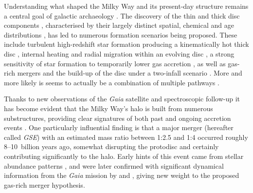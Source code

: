 \documentclass[fleqn,usenatbib]{mnras}
\begin{document}
Understanding what shaped the Milky Way and its present-day structure remains a central goal of galactic archaeology \citep{FreemanBlandHawthorn2002,BlandHawthorn_Gerhard2016}. The discovery of the thin and thick disc components \citep{Yoshii1982, Gilmore1983}, characterised by their largely distinct spatial, chemical and age distributions \citep[for example][]{Bensby2014, Hayden2015}, has led to numerous formation scenarios being proposed. These include turbulent high-redshift star formation producing a kinematically hot thick disc \citep{Bird2013, Stinson2013}, internal heating and radial migration within an evolving disc \citep{Schoenrich2009, Minchev2013, Sharma2021b}, a strong sensitivity of star formation to temporarily lower gas accretion \citep{Grand2018, Orkney2025}, as well as gas-rich mergers \citep{Brook2004, Buck2020} and the build-up of the disc under a two-infall scenario \citep{Chiappini1997, Spitoni2019}. More and more likely is seems to actually be a combination of multiple pathways \citep[e.g.][]{Orkney2025}.

Thanks to new observations of the \textit{Gaia} satellite \citep{Brown2021b} and spectroscopic follow-up it has become evident that the Milky Way's halo is built from numerous substructures, providing clear signatures of both past and ongoing accretion events \citep{Belokurov2006, Myeong2018c, Koppelman2019, Naidu2020, Yuan2020, Dodd2023}. One particularly influential finding is that a major merger (hereafter called \textit{GSE}) with an estimated mass ratio between 1:2.5 and 1:4 \citep{Helmi2018, Naidu2020} occurred roughly 8–10~billion years ago, somewhat disrupting the protodisc and certainly contributing significantly to the halo. Early hints of this event came from stellar abundance patterns \citep{Nissen2010}, and were later confirmed with significant dynamical information from the \textit{Gaia} mission \citep{Brown2016, Brown2018} by \citet{Belokurov2018} and \citet{Helmi2018}, giving new weight to the proposed gas-rich merger hypothesis.
\end{document}
